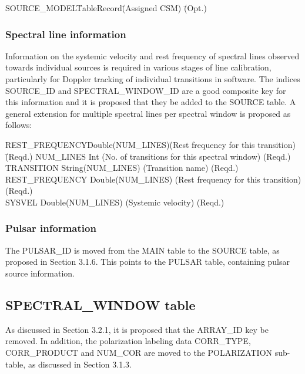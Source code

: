 \documentclass{article}
\begin{document}
\begin{tabbing}
SOURCE\_MODEL\quad\quad \= TableRecord\quad\quad \= 
(Assigned CSM) \quad\quad \= (Opt.) \\
\end{tabbing}

\subsubsection{Spectral line information}

Information on the systemic velocity and rest frequency of spectral
lines observed towards individual sources is required in various
stages of line calibration, particularly for Doppler tracking of
individual transitions in software. The indices SOURCE\_ID and
SPECTRAL\_WINDOW\_ID are a good composite key for this information and
it is proposed that they be added to the SOURCE table. A general
extension for multiple spectral lines per spectral window is proposed
as follows:

\begin{tabbing}
REST\_FREQUENCY\quad\quad \= Double(NUM\_LINES)\quad\quad \=
(Rest frequency for this transition)\quad\quad\quad\quad\quad \= (Reqd.) \kill
NUM\_LINES \> Int \> 
(No. of transitions for this spectral window) \> (Reqd.) \\
TRANSITION           \> String(NUM\_LINES)  \> 
(Transition name) \> (Reqd.) \\
REST\_FREQUENCY       \> Double(NUM\_LINES) \>
(Rest frequency for this transition) \> (Reqd.) \\
SYSVEL               \> Double(NUM\_LINES) \>
(Systemic velocity) \> (Reqd.) \\
\end{tabbing}

\subsubsection{Pulsar information}

 The PULSAR\_ID is moved from the MAIN table to the SOURCE table, as
proposed in Section 3.1.6. This points to the PULSAR table, containing
pulsar source information.

\subsection{SPECTRAL\_WINDOW table}

As discussed in Section 3.2.1, it is proposed that the ARRAY\_ID key be
removed.  In addition, the polarization labeling data CORR\_TYPE,
CORR\_PRODUCT and NUM\_COR are moved to the POLARIZATION sub-table, as
discussed in Section 3.1.3.
\end{document}
